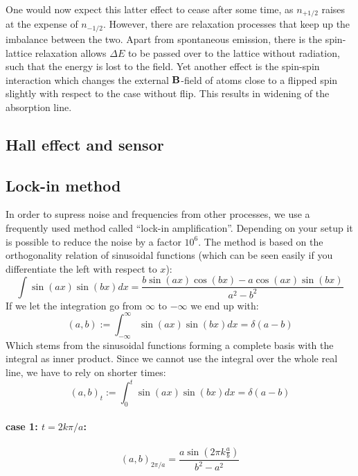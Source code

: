 One would now expect this latter effect to cease after some time, as $n_{+1/2}$ raises at the expense of 
$n_{-1/2}$. However, there are relaxation processes that keep up the imbalance between the two. 
Apart from spontaneous emission, there is the spin-lattice relaxation allows $\Delta E$ to be passed 
over to the lattice without radiation, such that the energy is lost to the field. 
Yet another effect is the spin-spin interaction which changes the external $\mathbf{B}$-field of atoms close 
to a flipped spin slightly with respect to the case without flip. This results in widening of the 
absorption line. 

\subsection{Hall effect and sensor}

\subsection{Lock-in method}
In order to supress noise and frequencies from other processes, we use
a frequently used method called ``lock-in amplification''. Depending on your
setup it is possible to reduce the noise by a factor $10^6$. The method
is based on the orthogonality relation of sinusoidal functions (which
can be seen easily if you differentiate the left with respect to $x$):
\begin{equation}
    \int \sin(a x) \sin(b x) dx =\frac{ b \sin(a x) \cos(b x)-a \cos(a x)
            \sin(b x)}{a^2-b^2}
\end{equation}
If we let the integration go from $\infty$ to $-\infty$ we end up with:
\begin{equation}
    (a,b) := \int_{-\infty}^{\infty} \sin(a x) \sin(b x) dx = \delta(a - b)
\end{equation}
Which stems from the sinusoidal functions forming a complete basis with
the integral as inner product.
Since we cannot use the integral over the whole real line, we have to rely
on shorter times: 
\begin{equation}
    (a,b)_t := \int_{0}^{t} \sin(a x) \sin(b x) dx = \delta(a - b)
\end{equation}
\paragraph{case 1: $t = 2k\pi /a$:}
\begin{equation}
    (a,b)_{2\pi /a} = \frac{a \sin(2\pi k\frac{a}{b})}{b^2 - a^2}
\end{equation}
